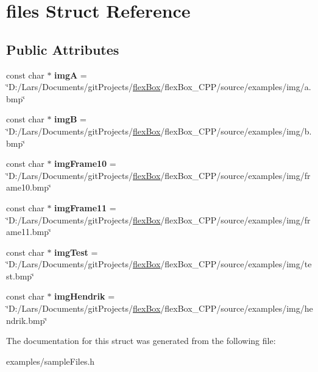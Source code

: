 \hypertarget{structfiles}{}\section{files Struct Reference}
\label{structfiles}
\subsection*{Public Attributes}
\begin{DoxyCompactItemize}
\item 
\mbox{\label{structfiles_aa495e42bb265a1146d9953cdcaba78d6}} 
const char $\ast$ {\bfseries imgA} = \char`\"{}D\+:/Lars/Documents/git\+Projects/\hyperlink{classflex_box}{flex\+Box}/flex\+Box\+\_\+\+C\+PP/source/examples/img/a.\+bmp\char`\"{}
\item 
\mbox{\label{structfiles_aacb22a3214efc11a4aae31b5f838489f}} 
const char $\ast$ {\bfseries imgB} = \char`\"{}D\+:/Lars/Documents/git\+Projects/\hyperlink{classflex_box}{flex\+Box}/flex\+Box\+\_\+\+C\+PP/source/examples/img/b.\+bmp\char`\"{}
\item 
\mbox{\label{structfiles_a1dfe3fea0db79df87282f92bf9543fb4}} 
const char $\ast$ {\bfseries img\+Frame10} = \char`\"{}D\+:/Lars/Documents/git\+Projects/\hyperlink{classflex_box}{flex\+Box}/flex\+Box\+\_\+\+C\+PP/source/examples/img/frame10.\+bmp\char`\"{}
\item 
\mbox{\label{structfiles_a8ab9fe6b503cf4232f0514625a421acc}} 
const char $\ast$ {\bfseries img\+Frame11} = \char`\"{}D\+:/Lars/Documents/git\+Projects/\hyperlink{classflex_box}{flex\+Box}/flex\+Box\+\_\+\+C\+PP/source/examples/img/frame11.\+bmp\char`\"{}
\item 
\mbox{\label{structfiles_a205f0db0bc19adee7a177c614267640c}} 
const char $\ast$ {\bfseries img\+Test} = \char`\"{}D\+:/Lars/Documents/git\+Projects/\hyperlink{classflex_box}{flex\+Box}/flex\+Box\+\_\+\+C\+PP/source/examples/img/test.\+bmp\char`\"{}
\item 
\mbox{\label{structfiles_aa993d6a9e8e0238ed999c40cf2651562}} 
const char $\ast$ {\bfseries img\+Hendrik} = \char`\"{}D\+:/Lars/Documents/git\+Projects/\hyperlink{classflex_box}{flex\+Box}/flex\+Box\+\_\+\+C\+PP/source/examples/img/hendrik.\+bmp\char`\"{}
\end{DoxyCompactItemize}


The documentation for this struct was generated from the following file\+:\begin{DoxyCompactItemize}
\item 
examples/sample\+Files.\+h\end{DoxyCompactItemize}
